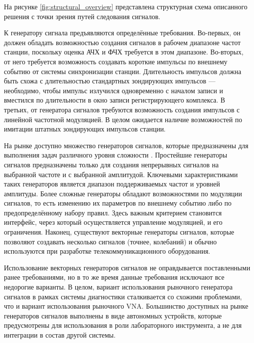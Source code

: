 \documentclass{report}
\begin{document}
\pagebreak

На рисунке \ref{fig:structural_overview} представлена структурная схема описанного решения с точки зрения путей следования сигналов.


К генератору сигнала предъявляются определённые требования. Во-первых, он должен обладать возможностью создания сигналов в рабочем диапазоне частот станции, поскольку оценка АЧХ и ФЧХ требуется в этом диапазоне. Во-вторых, от него требуется возможность создавать короткие импульсы по внешнему событию от системы синхронизации станции. Длительность импульсов должна быть схожа с длительностью стандартных зондирующих импульсов --- необходимо, чтобы импульс излучился одновременно с началом записи и вместился по длительности в окно записи регистрирующего комплекса. В третьих, от генератора сигналов требуются возможность создания импульсов с линейной частотной модуляцией. В целом ожидается наличие возможностей по имитации штатных зондирующих импульсов станции.


На рынке доступно множество генераторов сигналов, которые предназначены для выполнения задач различного уровня сложности \cite{siggen1} \cite{siggen2}. Простейшие генераторы сигналов предназначены только для создания непрерывных сигналов на выбранной частоте и с выбранной амплитудой. Ключевыми характеристиками таких генераторов является диапазон поддерживаемых частот и уровней амплитуды. Более сложные генераторы обладают возможностями по модуляции сигналов, то есть изменению их параметров по внешнему событию либо по предопределённому набору правил. Здесь важным критерием становится интерфейс, через который осуществляется управление модуляцией, и его ограничения. Наконец, существуют векторные генераторы сигналов, которые позволяют создавать несколько сигналов (точнее, колебаний) и обычно используются при разработке телекоммуникационного оборудования.

Использование векторных генераторов сигналов не оправдывается поставленными ранее требованиями, но в то же время данные требования исключают все недорогие варианты. В целом, вариант использования рыночного генератора сигналов в рамках системы диагностики сталкивается со схожими проблемами, что и вариант использования рыночного VNA. Большинство доступных на рынке генераторов сигналов выполнены в виде автономных устройств, которые предусмотрены для использования в роли лабораторного инструмента, а не для интеграции в состав другой системы.
\end{document}
